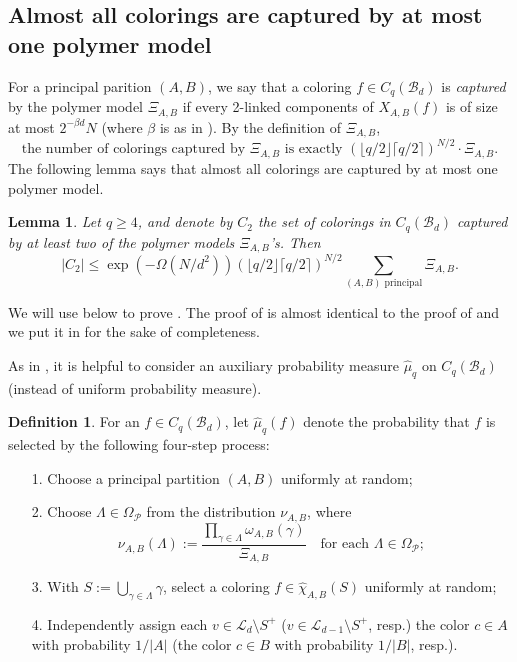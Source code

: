 \documentclass{amsart}
\newtheorem{lem}[thm]{Lemma}
\theoremstyle{definition}
\newtheorem{mydef}[thm]{Definition}
\newcommand{\we}{\omega}
\newcommand{\cB}{\mathcal{B} }
\newcommand{\cL}{\mathcal{L} }
\newcommand{\cP}{\mathcal{P} }
\newcommand{\beq}[1]{\begin{equation}\label{#1}}
\newcommand{\enq}[0]{\end{equation}}
\newcommand{\nin}[0]{\noindent}
\newcommand{\0}[0]{\emptyset}
\begin{document}
\subsection{Almost all colorings are captured by at most one polymer model}
For a principal parition $(A, B)$, we say that a coloring $f\in C_q(\cB_d)$ is \textit{captured} by the polymer model $\Xi_{A, B}$ if every 2-linked components of $X_{A, B}(f)$ is of size at most $2^{-\beta d}N$ (where $\beta$ is as in ). By the definition of $\Xi_{A, B}$, 
\begin{equation}\label{ineq:capture}
\text{the number of colorings captured by $\Xi_{A, B}$ is exactly }
(\lfloor q/2 \rfloor\lceil q/2 \rceil)^{N/2}\cdot\Xi_{A, B}.
\end{equation}
The following lemma says that almost all colorings are captured by at most one polymer model.
\begin{lem}\label{lem:capture1}
Let $q \geq 4$, and denote by $C_2$ the set of colorings in $C_q(\cB_d)$ captured by at least two of the polymer models $\Xi_{A, B}$'s. Then
\beq{eq:lem:capture1}
|C_2| \leq \exp\left(-\Omega\left(N/d^2\right)\right) (\lfloor q/2 \rfloor\lceil q/2 \rceil)^{N/2} \sum_{(A, B) \text{ principal}}\Xi_{A, B}.
\enq
\end{lem}
\nin We will use  below to prove . The proof of  is almost identical to the proof of \cite[Lemma~11.2]{JK} and we put it in  for the sake of completeness.

As in \cite{JK}, it is helpful to consider an auxiliary probability measure $\hat{\mu}_q$ on $C_q(\cB_d)$ (instead of uniform probability measure).

\begin{mydef} \label{def:muh}
For an $f \in C_q(\cB_d)$, let $\hat{\mu}_q(f)$ denote the probability that $f$ is selected by the following four-step process:

\begin{itemize}
    \item[1.] Choose a principal partition $(A, B)$ uniformly at random;
    \item[2.] Choose $\Lambda \in \Omega_{\cP}$ from the distribution $\nu_{A, B}$, where
\begin{equation}\label{def:rd}
\nu_{A, B}(\Lambda):=\frac{\prod_{\gamma\in\Lambda}\we_{A, B}(\gamma)}{\Xi_{A, B}} \quad \mbox{for each $\Lambda\in\Omega_{\cP}$};
\end{equation}
    \item[3.] With $S:=\bigcup_{\gamma\in\Lambda}\gamma$, select a coloring $f\in \hat{\chi}_{A, B}(S)$ uniformly at random;
    \item[4.] Independently assign each $v\in \cL_d\setminus S^+$ ($v\in \cL_{d-1}\setminus S^+$, resp.) the color $c\in A$ with probability $1/|A|$ (the color $c\in B$ with probability $1/|B|$, resp.).
\end{itemize}
\end{mydef}
\end{document}
